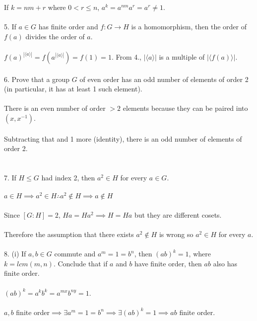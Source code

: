 \documentclass{article}
\begin{document}
\begin{siderules}
\null\qquad If \(k=nm+r\) where \(0<r\le n\), \(a^{k}=a^{nm}a^{r}=a^{r}\neq 1\).\\\\
\color{blue}5. If \(a\in G\) has finite order and \(f:G\to H\) is a homomorphism, then the order of \(f(a)\) divides the order of \(a\).\\\\\color{black}
\null\qquad \(f(a)^{|\langle a\rangle|}=f(a^{|\langle a\rangle|})=f(1)=1\). From \color{gray}4.\color{black}, \(|\langle a\rangle|\) is a multiple of \(|\langle f(a)\rangle|\).\\\\
\color{blue}6. Prove that a group \(G\) of even order has an odd number of elements of order 2 
(in particular, it has at least 1 such element).\\\\\color{black}
\null\qquad There is an even number of order \(>2\) elements because they can be paired into \((x,x^{-1})\).\\\\
\null\qquad Subtracting that and 1 more (identity), there is an odd number of elements of order 2.\\\\\\
\color{blue}7. If \(H\le G\) had index 2, then \(a^{2}\in H\) for every \(a\in G\).\\\\\color{black}
\null\qquad \( a\in H\implies a^{2}\in H\therefore a^{2}\notin H\implies a\notin H\) \\\\
\null\qquad Since \([G:H]=2\), \(Ha=Ha^{2}\implies H=Ha\) but they are different cosets.\\\\
\null\qquad Therefore the assumption that there exists \(a^{2}\notin H\) is wrong so \(a^{2}\in H\) for every \(a\).\\\\
\color{blue}8. (i) If \(a,b\in G\) commute and \(a^{m}=1=b^{n}\), then \((ab)^{k}=1\), where \(k=lcm(m,n)\). Conclude that if 
\(a\) and \(b\) have finite order, then \(ab\) also has finite order.\\\\\color{black}
\null\qquad \((ab)^{k}=a^{k}b^{k}=a^{mx}b^{ny}=1\).\\\\ \null\qquad  \(a,b\) finite order\(\implies\exists a^{m}=1=b^{n}\implies\exists(ab)^{k}=1\implies ab\) finite order.\\\\

\end{siderules}
\end{document}
